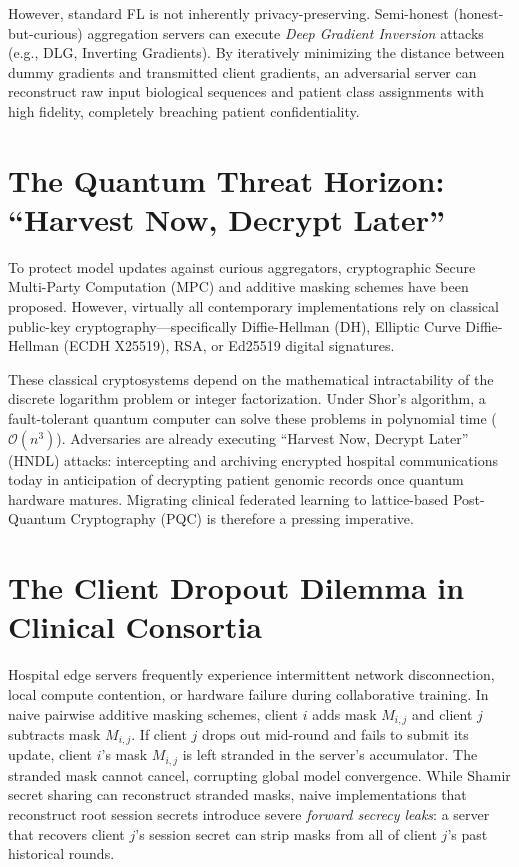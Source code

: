 \documentclass[11pt,a4paper]{report}
\begin{document}
However, standard FL is not inherently privacy-preserving. Semi-honest (honest-but-curious) aggregation servers can execute \emph{Deep Gradient Inversion} attacks (e.g., DLG, Inverting Gradients). By iteratively minimizing the distance between dummy gradients and transmitted client gradients, an adversarial server can reconstruct raw input biological sequences and patient class assignments with high fidelity, completely breaching patient confidentiality.

\section{The Quantum Threat Horizon: ``Harvest Now, Decrypt Later''}
To protect model updates against curious aggregators, cryptographic Secure Multi-Party Computation (MPC) and additive masking schemes have been proposed. However, virtually all contemporary implementations rely on classical public-key cryptography—specifically Diffie-Hellman (DH), Elliptic Curve Diffie-Hellman (ECDH X25519), RSA, or Ed25519 digital signatures.

These classical cryptosystems depend on the mathematical intractability of the discrete logarithm problem or integer factorization. Under Shor's algorithm, a fault-tolerant quantum computer can solve these problems in polynomial time ($\mathcal{O}(n^3)$). Adversaries are already executing ``Harvest Now, Decrypt Later'' (HNDL) attacks: intercepting and archiving encrypted hospital communications today in anticipation of decrypting patient genomic records once quantum hardware matures. Migrating clinical federated learning to lattice-based Post-Quantum Cryptography (PQC) is therefore a pressing imperative.

\section{The Client Dropout Dilemma in Clinical Consortia}
Hospital edge servers frequently experience intermittent network disconnection, local compute contention, or hardware failure during collaborative training. In naive pairwise additive masking schemes, client $i$ adds mask $M_{i,j}$ and client $j$ subtracts mask $M_{i,j}$. If client $j$ drops out mid-round and fails to submit its update, client $i$'s mask $M_{i,j}$ is left stranded in the server's accumulator. The stranded mask cannot cancel, corrupting global model convergence. While Shamir secret sharing can reconstruct stranded masks, naive implementations that reconstruct root session secrets introduce severe \emph{forward secrecy leaks}: a server that recovers client $j$'s session secret can strip masks from all of client $j$'s past historical rounds.
\end{document}

